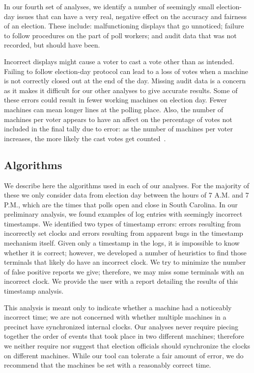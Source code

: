 \documentclass[letterpaper,twocolumn,10pt]{article}
\begin{document}
In our fourth set of analyses, we identify a number of seemingly small
election-day issues that can have a very real, negative effect on the accuracy
and fairness of an election. These include:
malfunctioning
displays that go unnoticed; failure to follow procedures on the part of poll
workers; and audit data that was not recorded, but should have been.

Incorrect displays might cause a voter to cast a vote other than as intended. Failing to follow election-day protocol can lead to a loss of votes when a
machine is not correctly closed out at the end of the day. Missing audit data is
a concern as it makes it difficult for our other analyses to give accurate results. Some of these errors 
could result in fewer working machines on election day. Fewer machines can mean longer lines at the polling place. Also, the number of machines per voter appears to have an 
affect on the percentage of votes not included in the final tally due to error: 
as the number of machines per voter increases, the more likely the cast votes 
get counted~\cite{DNC2005}.

 
\subsection{Algorithms}
We describe here the algorithms used in each of our analyses. For the
majority of these we only consider data from election day between the hours of
7 A.M. and 7 P.M., which are the times that polls open and close in South
Carolina. In our preliminary analysis, we found examples of log entries with
seemingly incorrect timestamps. We identified two types of timestamp errors:
errors resulting from incorrectly set clocks and errors resulting from apparent
bugs in the timestamp mechanism itself. Given only a timestamp in the logs, it
is impossible to know whether it is correct; however, we developed a number of
heuristics to find those terminals that likely do have an incorrect clock. We
try to minimize the number of false positive reports we give; therefore, we
may miss some terminals with an incorrect clock. We provide the user with a report detailing the
results of this timestamp analysis. 

This analysis is meant only to indicate whether a 
machine had a noticeably incorrect time; we are not concerned with whether
multiple machines in a precinct have synchronized internal clocks. Our 
analyses never require piecing together the order of events that took place in two 
different machines; therefore we neither require nor suggest that 
election officials should synchronize the clocks on different machines. While 
our tool can tolerate a fair amount of error, we do 
recommend that the machines be set with a reasonably correct time.
\end{document}
